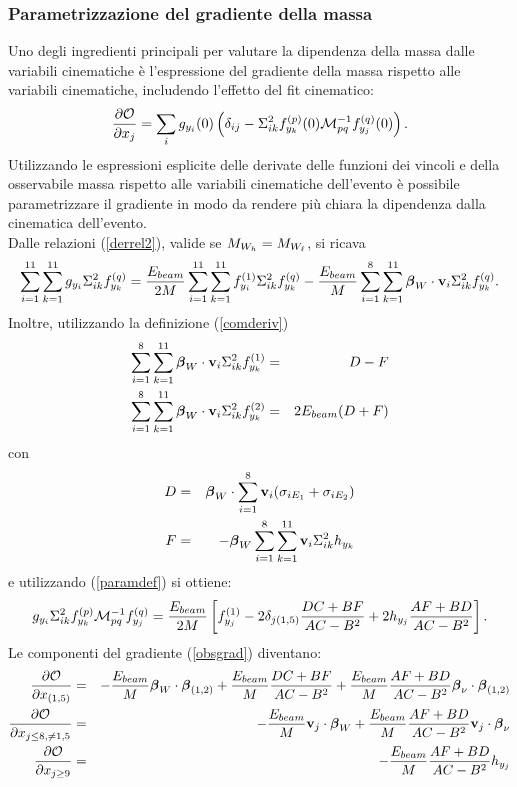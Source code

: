 \subsubsection{Parametrizzazione del gradiente della massa}
%
Uno degli ingredienti principali per valutare la dipendenza della massa dalle
variabili cinematiche \`e l'espressione del gradiente della massa rispetto
alle variabili cinematiche, includendo l'effetto del fit cinematico:
\begin{equation}
\label{obsgrad}
\frac{\partial{\cal O}}{\partial x_j}=\sum_ig_{y_i}(0)\left(\delta_{ij}-\Sigma^2_{ik}f^{(p)}_{y_k}(0){\cal M}^{-1}_{pq}f^{(q)}_{y_j}(0)\right).
\end{equation}
Utilizzando le espressioni esplicite delle derivate delle funzioni dei vincoli
e della osservabile massa rispetto alle variabili cinematiche dell'evento \`e possibile parametrizzare il gradiente in modo da rendere pi\`u chiara la
dipendenza dalla cinematica dell'evento.\\
Dalle relazioni (\ref{derrel2}), valide se $M_{W_h}=M_{W_\ell}$, si ricava
\[\sum_{i=1}^{11}\sum_{k=1}^{11}g_{y_i}\Sigma^2_{ik}f^{(q)}_{y_k}=\frac{E_{beam}}{2M}\sum_{i=1}^{11}\sum_{k=1}^{11}f^{(1)}_{y_i}\Sigma^2_{ik}f^{(q)}_{y_k}-\frac{E_{beam}}{M}\sum_{i=1}^8\sum_{k=1}^{11}\mbox{\boldmath $\beta$}_W\cdot{\bf v}_i\Sigma^2_{ik}f^{(q)}_{y_k}.\]
Inoltre, utilizzando la definizione (\ref{comderiv})
\begin{eqnarray*}
\sum_{i=1}^8\sum_{k=1}^{11}\mbox{\boldmath $\beta$}_W\cdot{\bf v}_i\Sigma^2_{ik}f^{(1)}_{y_k}&=&D-F\\
\sum_{i=1}^8\sum_{k=1}^{11}\mbox{\boldmath $\beta$}_W\cdot{\bf v}_i\Sigma^2_{ik}f^{(2)}_{y_k}&=&2E_{beam}(D+F)
\end{eqnarray*}
con
\begin{eqnarray*}
D&=&\mbox{\boldmath $\beta$}_W\cdot\sum_{i=1}^8{\bf v}_i(\sigma_{iE_1}+\sigma_{iE_2})\\
F&=&-\mbox{\boldmath $\beta$}_W\sum_{i=1}^8\sum_{k=1}^{11}{\bf v}_i\Sigma^2_{ik}h_{y_k}
\end{eqnarray*}
e utilizzando (\ref{paramdef}) si ottiene:
\[g_{y_i}\Sigma^2_{ik}f^{(p)}_{y_k}{\cal M}^{-1}_{pq}f^{(q)}_{y_j}=\frac{E_{beam}}{2M}\left[f^{(1)}_{y_j}-2\delta_{j(1,5)}\frac{DC+BF}{AC-B^2}+2h_{y_j}\frac{AF+BD}{AC-B^2}\right].\]
Le componenti del gradiente (\ref{obsgrad}) diventano:
\begin{eqnarray*}
\frac{\partial{\cal O}}{\partial x_{(1,5)}}&=&-\frac{E_{beam}}{M}\mbox{\boldmath $\beta$}_W\cdot{\mbox{\boldmath $\beta$}_{(1,2)}}+\frac{E_{beam}}{M}\frac{DC+BF}{AC-B^2}+\frac{E_{beam}}{M}\frac{AF+BD}{AC-B^2}\mbox{\boldmath $\beta$}_\nu\cdot{\mbox{\boldmath $\beta$}_{(1,2)}}\\
\frac{\partial{\cal O}}{\partial x_{j\le 8,\ne 1,5}}&=&-\frac{E_{beam}}{M}{\bf v}_j\cdot\mbox{\boldmath $\beta$}_W+\frac{E_{beam}}{M}\frac{AF+BD}{AC-B^2}{\bf v}_j\cdot\mbox{\boldmath $\beta$}_\nu\\
\frac{\partial{\cal O}}{\partial x_{j\ge 9}}&=&-\frac{E_{beam}}{M}\frac{AF+BD}{AC-B^2}h_{y_j}
\end{eqnarray*}


